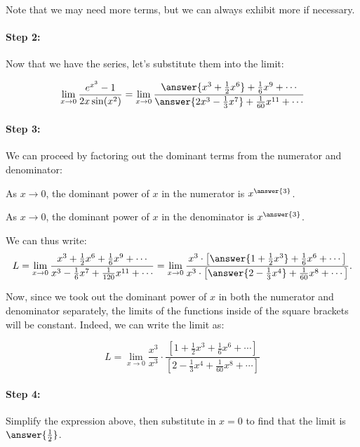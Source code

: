 \documentclass{ximera}
\begin{document}
\begin{exercise}
\begin{exercise}
Note that we may need more terms, but we can always exhibit more if necessary.  

\paragraph{Step 2:} Now that we have the series, let's substitute them into the limit:

\[
\lim_{x \to 0} \frac{e^{x^3}-1}{2x \sin(x^2)} = \lim_{x \to 0} \frac{  \answer{x^3+\frac{1}{2}x^6}+\frac{1}{6}x^9 +\cdots}{\answer{2x^3-\frac{1}{3}x^7}+\frac{1}{60}x^{11} +\cdots}
\]

\paragraph{Step 3:} We can proceed by factoring out the dominant terms from the numerator and denominator:

As $x \to 0$, the dominant power of $x$ in the numerator is $x^{\answer{3}}$.

As $x \to 0$, the dominant power of $x$ in the denominator is $x^{\answer{3}}$.

\begin{exercise}
We can thus write:
\[
L = \lim_{x \to 0} \frac{ x^3+\frac{1}{2}x^6+\frac{1}{6}x^9 +\cdots}{x^3-\frac{1}{6}x^7+\frac{1}{120}x^{11} +\cdots}  = \lim_{x \to 0} \frac{ x^3 \cdot \left[\answer{1+\frac{1}{2}x^3}+\frac{1}{6}x^6 +\cdots\right]}{x^3 \cdot \left[\answer{2-\frac{1}{3}x^4}+\frac{1}{60}x^8 +\cdots\right]}.
\]

\begin{exercise}
 Now, since we took out the dominant power of $x$ in both the numerator and denominator separately, the limits of the functions inside of the square brackets will be constant.  Indeed, we can write the limit as:

\[
L = \lim_{x \to 0} \frac{x^3}{x^3} \cdot \frac{\left[1+\frac{1}{2}x^3+\frac{1}{6}x^6+\cdots \right]}{\left[2-\frac{1}{3}x^4+\frac{1}{60}x^8 +\cdots \right]}
\]

\paragraph{Step 4:} Simplify the expression above, then substitute in $x=0$ to find that the limit is $\answer{\frac{1}{2}}$.


\end{exercise}
\end{exercise}
\end{exercise}
\end{exercise}
\end{document}
